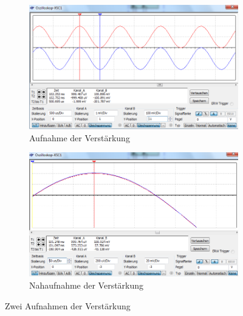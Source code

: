 \documentclass[12pt,a4paper]{article}
\begin{document}
\begin{figure}[H]
        \centering
        \begin{subfigure}[b]{0.48\textwidth}
               \includegraphics[scale = 0.4]{4_1_100.PNG}
				\caption[Aufnahme der Verstärkung]{Aufnahme der Verstärkung\footnotemark}
 				 \label{fig:4_1_100}
        \end{subfigure}%
        \hfill
        \begin{subfigure}[b]{0.48\textwidth}
                \includegraphics[scale = 0.4]{4_1_101.PNG}
  				\caption[Nahaufnahme der Verstärkung]{Nahaufnahme der Verstärkung\footnotemark}
  				\label{fig:4_1_101}
        \end{subfigure}
        \caption{Zwei Aufnahmen der Verstärkung}
        \label{fig:4_1}
\end{figure}
\end{document}
